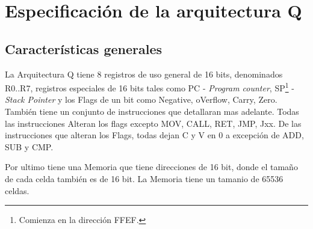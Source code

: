 \section{Especificación de la arquitectura Q}\label{apendiceQ}

\subsection{Características generales} 

La Arquitectura Q tiene 8 registros de uso general de 16 bits, denominados R0..R7, registros especiales de 16 bits tales como PC - \textit{Program counter}, SP\footnote{Comienza en la dirección FFEF.} - \textit{Stack Pointer} y los Flags de un bit como Negative, oVerflow, Carry, Zero. También tiene un conjunto de instrucciones que detallaran mas adelante. Todas las instrucciones Alteran los flags excepto MOV, CALL, RET, JMP, Jxx. De las instrucciones que alteran los Flags, todas dejan C y V en 0 a excepción de ADD, SUB y CMP.  

Por ultimo tiene una Memoria que tiene direcciones de 16 bit, donde el tamaño de cada celda también es de 16 bit. La Memoria tiene un tamanio de 65536 celdas. \\ 
